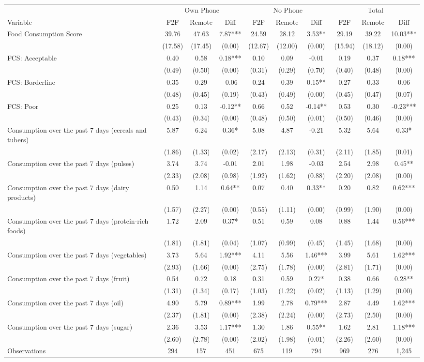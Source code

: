 \begin{tabular}{l*{9}c}
\hline\hline
 & \multicolumn{3}{c}{Own Phone} & \multicolumn{3}{c}{No Phone} & \multicolumn{3}{c}{Total}\\ 
Variable & F2F & Remote & Diff & F2F & Remote & Diff & F2F & Remote & Diff \\
\hline
Food Consumption Score&39.76&47.63&7.87***&24.59&28.12&3.53**&29.19&39.22&10.03***\\
&(17.58)&(17.45)&(0.00)&(12.67)&(12.00)&(0.00)&(15.94)&(18.12)&(0.00)\\
FCS: Acceptable&0.40&0.58&0.18***&0.10&0.09&-0.01&0.19&0.37&0.18***\\
&(0.49)&(0.50)&(0.00)&(0.31)&(0.29)&(0.70)&(0.40)&(0.48)&(0.00)\\
FCS: Borderline&0.35&0.29&-0.06&0.24&0.39&0.15**&0.27&0.33&0.06\\
&(0.48)&(0.45)&(0.19)&(0.43)&(0.49)&(0.00)&(0.45)&(0.47)&(0.07)\\
FCS: Poor&0.25&0.13&-0.12**&0.66&0.52&-0.14**&0.53&0.30&-0.23***\\
&(0.43)&(0.34)&(0.00)&(0.48)&(0.50)&(0.01)&(0.50)&(0.46)&(0.00)\\
Consumption over the past 7 days (cereals and tubers)&5.87&6.24&0.36*&5.08&4.87&-0.21&5.32&5.64&0.33*\\
&(1.86)&(1.33)&(0.02)&(2.17)&(2.13)&(0.31)&(2.11)&(1.85)&(0.01)\\
Consumption over the past 7 days (pulses)&3.74&3.74&-0.01&2.01&1.98&-0.03&2.54&2.98&0.45**\\
&(2.33)&(2.08)&(0.98)&(1.92)&(1.62)&(0.88)&(2.20)&(2.08)&(0.00)\\
Consumption over the past 7 days (dairy products)&0.50&1.14&0.64**&0.07&0.40&0.33**&0.20&0.82&0.62***\\
&(1.57)&(2.27)&(0.00)&(0.55)&(1.11)&(0.00)&(0.99)&(1.90)&(0.00)\\
Consumption over the past 7 days (protein-rich foods)&1.72&2.09&0.37*&0.51&0.59&0.08&0.88&1.44&0.56***\\
&(1.81)&(1.81)&(0.04)&(1.07)&(0.99)&(0.45)&(1.45)&(1.68)&(0.00)\\
Consumption over the past 7 days (vegetables)&3.73&5.64&1.92***&4.11&5.56&1.46***&3.99&5.61&1.62***\\
&(2.93)&(1.66)&(0.00)&(2.75)&(1.78)&(0.00)&(2.81)&(1.71)&(0.00)\\
Consumption over the past 7 days (fruit)&0.54&0.72&0.18&0.31&0.59&0.27*&0.38&0.66&0.28**\\
&(1.31)&(1.34)&(0.17)&(1.03)&(1.22)&(0.02)&(1.13)&(1.29)&(0.00)\\
Consumption over the past 7 days (oil)&4.90&5.79&0.89***&1.99&2.78&0.79***&2.87&4.49&1.62***\\
&(2.37)&(1.81)&(0.00)&(2.38)&(2.24)&(0.00)&(2.73)&(2.50)&(0.00)\\
Consumption over the past 7 days (sugar)&2.36&3.53&1.17***&1.30&1.86&0.55**&1.62&2.81&1.18***\\
&(2.60)&(2.78)&(0.00)&(2.02)&(1.98)&(0.01)&(2.26)&(2.60)&(0.00)\\
\hline
Observations & 294 & 157 & 451 & 675 & 119 & 794 & 969 & 276 & 1,245 \\
\hline\hline
\end{tabular}
